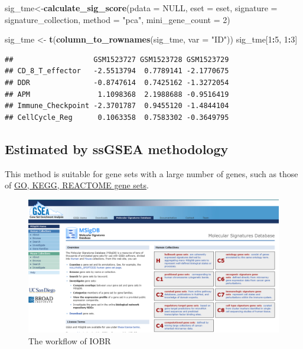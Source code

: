 \documentclass[
  12pt,
]{book}
\newenvironment{Shaded}{\begin{snugshade}}{\end{snugshade}}
\newcommand{\AttributeTok}[1]{\textcolor[rgb]{0.13,0.29,0.53}{#1}}
\newcommand{\ConstantTok}[1]{\textcolor[rgb]{0.56,0.35,0.01}{#1}}
\newcommand{\DecValTok}[1]{\textcolor[rgb]{0.00,0.00,0.81}{#1}}
\newcommand{\FunctionTok}[1]{\textcolor[rgb]{0.13,0.29,0.53}{\textbf{#1}}}
\newcommand{\NormalTok}[1]{#1}
\newcommand{\OtherTok}[1]{\textcolor[rgb]{0.56,0.35,0.01}{#1}}
\newcommand{\SpecialCharTok}[1]{\textcolor[rgb]{0.81,0.36,0.00}{\textbf{#1}}}
\newcommand{\StringTok}[1]{\textcolor[rgb]{0.31,0.60,0.02}{#1}}
\theoremstyle{definition}
\theoremstyle{definition}
\theoremstyle{definition}
\theoremstyle{definition}
\theoremstyle{remark}
\begin{document}
\begin{Shaded}
\begin{Highlighting}[]
\NormalTok{sig\_tme}\OtherTok{\textless{}{-}}\FunctionTok{calculate\_sig\_score}\NormalTok{(}\AttributeTok{pdata           =} \ConstantTok{NULL}\NormalTok{,}
                             \AttributeTok{eset            =}\NormalTok{ eset,}
                             \AttributeTok{signature       =}\NormalTok{ signature\_collection,}
                             \AttributeTok{method          =} \StringTok{"pca"}\NormalTok{,}
                             \AttributeTok{mini\_gene\_count =} \DecValTok{2}\NormalTok{)}

\NormalTok{sig\_tme }\OtherTok{\textless{}{-}} \FunctionTok{t}\NormalTok{(}\FunctionTok{column\_to\_rownames}\NormalTok{(sig\_tme, }\AttributeTok{var =} \StringTok{"ID"}\NormalTok{))}
\NormalTok{sig\_tme[}\DecValTok{1}\SpecialCharTok{:}\DecValTok{5}\NormalTok{, }\DecValTok{1}\SpecialCharTok{:}\DecValTok{3}\NormalTok{]}
\end{Highlighting}
\end{Shaded}

\begin{verbatim}
##                   GSM1523727 GSM1523728 GSM1523729
## CD_8_T_effector   -2.5513794  0.7789141 -2.1770675
## DDR               -0.8747614  0.7425162 -1.3272054
## APM                1.1098368  2.1988688 -0.9516419
## Immune_Checkpoint -2.3701787  0.9455120 -1.4844104
## CellCycle_Reg      0.1063358  0.7583302 -0.3649795
\end{verbatim}

\hypertarget{estimated-by-ssgsea-methodology}{%
\subsection{Estimated by ssGSEA methodology}\label{estimated-by-ssgsea-methodology}}

This method is suitable for gene sets with a large number of genes, such as those of \href{https://www.gsea-msigdb.org/gsea/msigdb}{GO, KEGG, REACTOME gene sets}.

\begin{figure}

{\centering \includegraphics[width=0.95\linewidth]{./fig/gsea} 

}

\caption{The workflow of IOBR}\label{fig:unnamed-chunk-42}
\end{figure}
\end{document}
